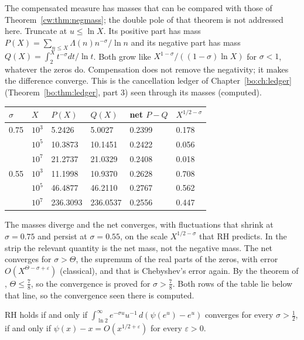 The compensated measure has masses that can be compared with those of Theorem~\ref{cw:thm:negmass}; the double pole of that theorem is not addressed here. Truncate at $u\le\ln X$. Its positive part has mass $P(X)=\sum_{n\le X}\Lambda(n)n^{-\sigma}/\ln n$ and its negative part has mass $Q(X)=\int_2^Xt^{-\sigma}dt/\ln t$. Both grow like $X^{1-\sigma}/((1-\sigma)\ln X)$ for $\sigma<1$, whatever the zeros do. Compensation does not remove the negativity; it makes the difference converge. This is the cancellation ledger of Chapter~\ref{bo:ch:ledger} (Theorem~\ref{bo:thm:ledger}, part 3) seen through its masses (computed).
\begin{center}
\small
\begin{tabular}{llllll}
\toprule
$\sigma$ & $X$ & $P(X)$ & $Q(X)$ & net $P-Q$ & $X^{1/2-\sigma}$\\
\midrule
0.75 & $10^3$ & 5.2426 & 5.0027 & 0.2399 & 0.178\\
 & $10^5$ & 10.3873 & 10.1451 & 0.2422 & 0.056\\
 & $10^7$ & 21.2737 & 21.0329 & 0.2408 & 0.018\\
0.55 & $10^3$ & 11.1998 & 10.9370 & 0.2628 & 0.708\\
 & $10^5$ & 46.4877 & 46.2110 & 0.2767 & 0.562\\
 & $10^7$ & 236.3093 & 236.0537 & 0.2556 & 0.447\\
\bottomrule
\end{tabular}
\end{center}
The masses diverge and the net converges, with fluctuations that shrink at $\sigma=0.75$ and persist at $\sigma=0.55$, on the scale $X^{1/2-\sigma}$ that RH predicts. In the strip the relevant quantity is the net mass, not the negative mass. The net converges for $\sigma>\Theta$, the supremum of the real parts of the zeros, with error $O(X^{\Theta-\sigma+\varepsilon})$ (classical), and that is Chebyshev's error again. By the theorem of \cite{OAI26a}, $\Theta\le\frac78$, so the convergence is proved for $\sigma>\frac78$. Both rows of the table lie below that line, so the convergence seen there is computed.

\begin{proposition}[classical]\label{cw:prop:reduction}
RH holds if and only if $\int_{\ln2}^\infty e^{-\sigma u}u^{-1}\,d(\psi(e^u)-e^u)$ converges for every $\sigma>\frac12$, if and only if $\psi(x)-x=O(x^{1/2+\varepsilon})$ for every $\varepsilon>0$.
\end{proposition}

